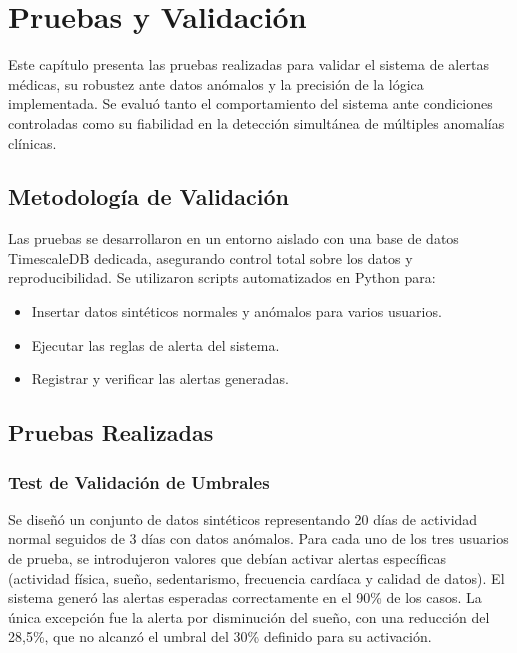 \chapter{Pruebas y Validación}
\label{chap:pruebas_validacion}

Este capítulo presenta las pruebas realizadas para validar el sistema de alertas médicas, su robustez ante datos anómalos y la precisión de la lógica implementada. Se evaluó tanto el comportamiento del sistema ante condiciones controladas como su fiabilidad en la detección simultánea de múltiples anomalías clínicas.

\section{Metodología de Validación}
\label{sec:metodologia_validacion}

Las pruebas se desarrollaron en un entorno aislado con una base de datos TimescaleDB dedicada, asegurando control total sobre los datos y reproducibilidad. Se utilizaron scripts automatizados en Python para:

\begin{itemize}
    \item Insertar datos sintéticos normales y anómalos para varios usuarios.
    \item Ejecutar las reglas de alerta del sistema.
    \item Registrar y verificar las alertas generadas.
\end{itemize}

\section{Pruebas Realizadas}
\label{sec:pruebas_realizadas}

\subsection{Test de Validación de Umbrales}
\label{subsec:test_thresholds}

Se diseñó un conjunto de datos sintéticos representando 20 días de actividad normal seguidos de 3 días con datos anómalos. Para cada uno de los tres usuarios de prueba, se introdujeron valores que debían activar alertas específicas (actividad física, sueño, sedentarismo, frecuencia cardíaca y calidad de datos).  
El sistema generó las alertas esperadas correctamente en el 90\% de los casos. La única excepción fue la alerta por disminución del sueño, con una reducción del 28,5\%, que no alcanzó el umbral del 30\% definido para su activación.

